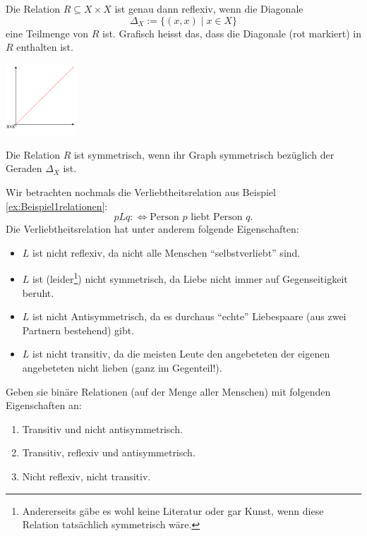 \begin{rk}
Die Relation $R\subseteq X\times X$ ist genau dann reflexiv, wenn die Diagonale
\[
\Delta_X:=\{(x,x)\mid x\in X \}
\]
eine Teilmenge von $R$ ist. Grafisch heisst das, dass die Diagonale (rot markiert) in $R$ enthalten ist.
\begin{center}
\includegraphics[width=0.2\textwidth]{figures/diagonale}
\end{center}
Die Relation $R$ ist symmetrisch, wenn ihr Graph symmetrisch bezüglich der Geraden $\Delta_X$ ist.
\end{rk}


\begin{bsp}
	Wir betrachten nochmals die Verliebtheitsrelation aus Beispiel \ref{ex:Beispiel1relationen}:
	\[
	pLq:\Leftrightarrow \text{Person $p$ liebt Person $q$.}
	\]
Die Verliebtheitsrelation hat unter anderem folgende Eigenschaften:
\begin{itemize}
	\item $L$ ist nicht reflexiv, da nicht alle Menschen ``selbstverliebt'' sind.
	\item $L$ ist (leider\footnote{Andererseits gäbe es wohl keine Literatur oder gar Kunst, wenn diese Relation tatsächlich symmetrisch wäre.}) nicht symmetrisch, da Liebe nicht immer auf Gegenseitigkeit beruht.
	\item $L$ ist nicht Antisymmetrisch, da es durchaus ``echte'' Liebespaare (aus zwei Partnern bestehend) gibt.
	\item $L$ ist nicht transitiv, da die meisten Leute den angebeteten der eigenen angebeteten nicht lieben (ganz im Gegenteil!).
\end{itemize}
\end{bsp}

\begin{ueb}
	Geben sie binäre Relationen (auf der Menge aller Menschen) mit folgenden Eigenschaften an:
	\begin{enumerate}
		\item Transitiv und nicht antisymmetrisch.
		\item Transitiv, reflexiv und antisymmetrisch.
		\item Nicht reflexiv, nicht transitiv.
	\end{enumerate}
\end{ueb}
\begin{lsg}
\end{lsg}

